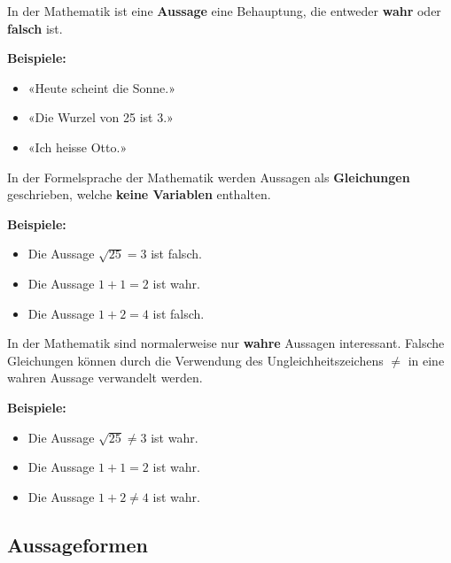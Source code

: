 In der Mathematik ist eine \textbf{Aussage} eine Behauptung, die entweder \textbf{wahr} oder \textbf{falsch} ist.
\begin{example}
  \textbf{Beispiele:}
  \begin{itemize}[noitemsep]
    \item «Heute scheint die Sonne.»
    \item «Die Wurzel von 25 ist 3.»
    \item «Ich heisse Otto.»
  \end{itemize}
\end{example}
In der Formelsprache der Mathematik werden Aussagen als \textbf{Gleichungen} geschrieben, welche \textbf{keine Variablen} enthalten.
\begin{example}
  \textbf{Beispiele:}
  \begin{itemize}[noitemsep]
    \item Die Aussage $\sqrt{25} = 3$ ist falsch.
    \item Die Aussage $1+1 = 2$ ist wahr.
    \item Die Aussage $1+2 = 4$ ist falsch.
  \end{itemize}
\end{example}
In der Mathematik sind normalerweise nur \textbf{wahre} Aussagen interessant. Falsche Gleichungen können durch die Verwendung des Ungleichheitszeichens $\ne$ in eine wahren Aussage verwandelt werden.
\begin{example}
  \textbf{Beispiele:}
  \begin{itemize}[noitemsep]
    \item Die Aussage $\sqrt{25} \ne 3$ ist wahr.
    \item Die Aussage $1+1 = 2$ ist wahr.
    \item Die Aussage $1+2 \ne 4$ ist wahr.
  \end{itemize}
\end{example}

\subsection{Aussageformen}

